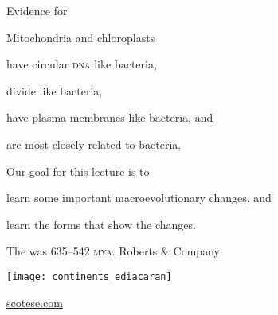 \documentclass[t]{beamer}
\begin{document}

\begin{frame}[t]{Evidence for  }

	\hangpara Mitochondria and chloroplasts
	
	\hangpara \hspace*{1em} have circular \textsc{dna} like bacteria,
	
	\hangpara \hspace*{1em} divide like bacteria,
	
	\hangpara \hspace*{1em} have plasma membranes like bacteria, and
	
	\hangpara \hspace*{1em} are most closely related to bacteria.
	
\end{frame}

\begin{frame}{Our goal for this lecture is to}
	
	\hangpara learn some important macroevolutionary changes, and
	
	\hangpara learn the  forms that show the changes.

\end{frame}
%
{
\begin{frame}[b]{The  was 635--542 \textsc{mya}.}
\hfill \tiny \textcopyright Roberts \& Company
\end{frame}
}
%
{
\begin{frame}[t]
	\texttt{[image: continents\_ediacaran]}
	
	\vfilll
	
	\hfill \tiny \textcolor{white}{\href{http://scotese.com}{scotese.com}}
\end{frame}
}
%
\end{document}
